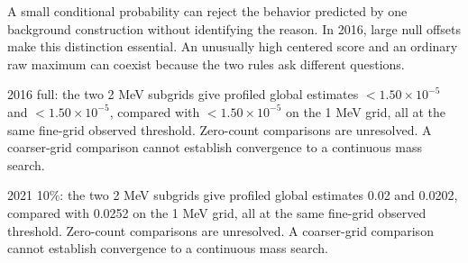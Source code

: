 A small conditional probability can reject the behavior predicted by one background construction without identifying the reason. In 2016, large null offsets make this distinction essential. An unusually high centered score and an ordinary raw maximum can coexist because the two rules ask different questions.

2016 full: the two 2 MeV subgrids give profiled global estimates $<$$1.50\times10^{-5}$ and $<$$1.50\times10^{-5}$, compared with $<$$1.50\times10^{-5}$ on the 1 MeV grid, all at the same fine-grid observed threshold. Zero-count comparisons are unresolved. A coarser-grid comparison cannot establish convergence to a continuous mass search.

2021 10\%: the two 2 MeV subgrids give profiled global estimates 0.02 and 0.0202, compared with 0.0252 on the 1 MeV grid, all at the same fine-grid observed threshold. Zero-count comparisons are unresolved. A coarser-grid comparison cannot establish convergence to a continuous mass search.
